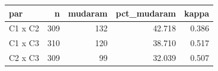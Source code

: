 \begin{tabular}{lrrrr}
\toprule
par & n & mudaram & pct_mudaram & kappa \\
\midrule
C1 x C2 & 309 & 132 & 42.718 & 0.386 \\
C1 x C3 & 310 & 120 & 38.710 & 0.517 \\
C2 x C3 & 309 & 99 & 32.039 & 0.507 \\
\bottomrule
\end{tabular}
